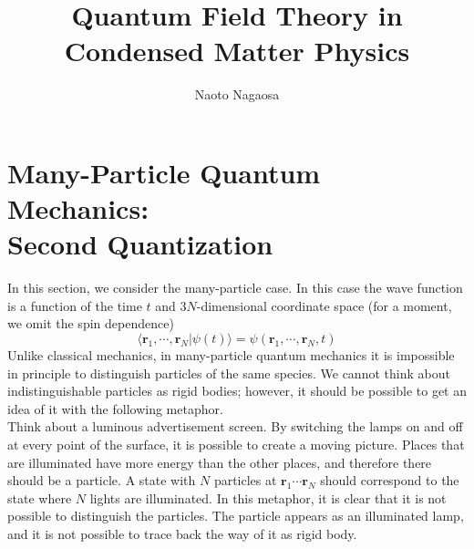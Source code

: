 \documentclass[twoside,11pt]{report}
\title{Quantum Field Theory in Condensed Matter Physics}
\author{Naoto Nagaosa}
\def\be{\begin{equation}}
\def\ee{\end{equation}}
\begin{document}
\maketitle
\tableofcontents
\setcounter{page}{0}



\section[Many-Particle Quantum Mechanics: Second Quantization]{Many-Particle Quantum Mechanics: \\ Second Quantization}

In this section, we consider the many-particle case. In this case the wave function is a function of the time $t$ and $3N$-dimensional coordinate space (for a moment, we omit the spin dependence)
\be
\langle\bm r_1,\cdots,\bm r_N|\psi(t)\rangle=\psi(\bm r_1,\cdots,\bm r_N,t)
\ee
Unlike classical mechanics, in many-particle quantum mechanics it is impossible in principle to distinguish particles of the same species. We cannot think about indistinguishable particles as rigid bodies; however, it should be possible to get an idea of it with the following metaphor. \\
\indent Think about a luminous advertisement screen. By switching the lamps on and off at every point of the surface, it is possible to create a moving picture. Places that are illuminated have more energy than the other places, and therefore there should be a particle. A state with $N$ particles at $\bm r_1\cdots\bm r_N$ should correspond to the state where $N$ lights are illuminated. In this metaphor, it is clear that it is not possible to distinguish the particles. The particle appears as an illuminated lamp, and it is not possible to trace back the way of it as rigid body. 
\end{document}

